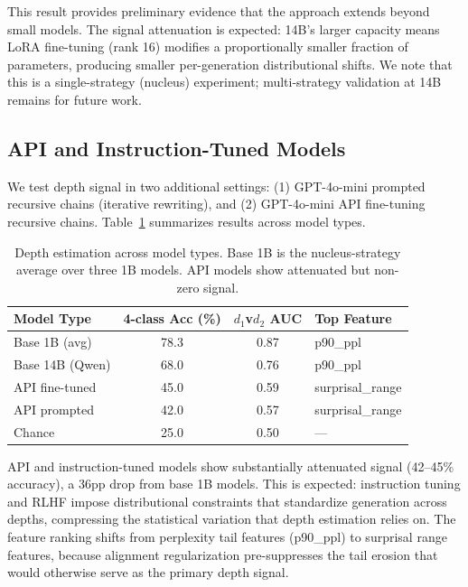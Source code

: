 \documentclass[11pt,a4paper]{article}
\begin{document}
This result provides preliminary evidence that the approach extends beyond small models. The signal attenuation is expected: 14B's larger capacity means LoRA fine-tuning (rank 16) modifies a proportionally smaller fraction of parameters, producing smaller per-generation distributional shifts. We note that this is a single-strategy (nucleus) experiment; multi-strategy validation at 14B remains for future work.

\subsection{API and Instruction-Tuned Models}

We test depth signal in two additional settings: (1) GPT-4o-mini prompted recursive chains (iterative rewriting), and (2) GPT-4o-mini API fine-tuning recursive chains. Table~\ref{tab:model_type} summarizes results across model types.

\begin{table}[t]
\centering
\caption{Depth estimation across model types. Base 1B is the nucleus-strategy average over three 1B models. API models show attenuated but non-zero signal.}
\label{tab:model_type}
\small
\begin{tabular}{lccl}
\toprule
\textbf{Model Type} & \textbf{4-class Acc (\%)} & \textbf{$d_1$v$d_2$ AUC} & \textbf{Top Feature} \\
\midrule
Base 1B (avg)         & 78.3 & 0.87 & p90\_ppl \\
Base 14B (Qwen)       & 68.0 & 0.76 & p90\_ppl \\
API fine-tuned        & 45.0 & 0.59 & surprisal\_range \\
API prompted          & 42.0 & 0.57 & surprisal\_range \\
Chance                & 25.0 & 0.50 & --- \\
\bottomrule
\end{tabular}
\end{table}

API and instruction-tuned models show substantially attenuated signal (42--45\% accuracy), a 36pp drop from base 1B models. This is expected: instruction tuning and RLHF impose distributional constraints that standardize generation across depths, compressing the statistical variation that depth estimation relies on. The feature ranking shifts from perplexity tail features (p90\_ppl) to surprisal range features, because alignment regularization pre-suppresses the tail erosion that would otherwise serve as the primary depth signal.
\end{document}
